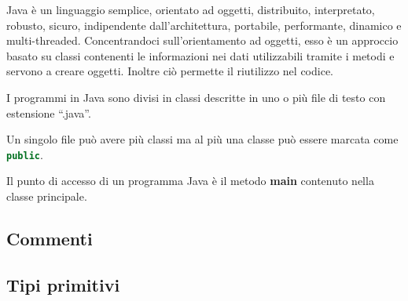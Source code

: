 \documentclass{subfiles}
\begin{document}
Java è un linguaggio semplice, orientato ad oggetti, distribuito, interpretato, robusto, sicuro, indipendente dall'architettura,
portabile, performante, dinamico e multi-threaded.
\noindent
Concentrandoci sull'orientamento ad oggetti, esso è un approccio basato su classi contenenti le informazioni nei dati utilizzabili
tramite i metodi e servono a creare oggetti. Inoltre ciò permette il riutilizzo nel codice.

I programmi in Java sono divisi in classi descritte in uno o più file di testo con estensione ``.java''.

\begin{Note*} \label{Note:1}
    Un singolo file può avere più classi ma al più una classe può essere marcata come \lstinline[language = java]{public}.
\end{Note*}
\begin{Note*}\label{Note:2}
    Il punto di accesso di un programma Java è il metodo \textbf{main} contenuto nella classe principale.
\end{Note*}


\subsection{Commenti}


\subsection{Tipi primitivi}

\end{document}
